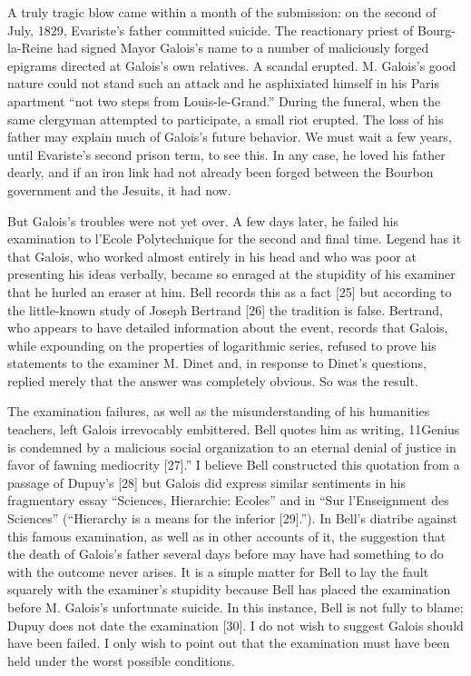 \documentclass[12pt]{article}
\begin{document}
A truly tragic blow came within a month of the submission: on the second of July, 1829, Evariste's father committed suicide. The reactionary priest of Bourg-la-Reine had signed Mayor Galois's name to a number of maliciously forged epigrams directed at Galois's own relatives. A scandal erupted. M. Galois's good nature could not stand such an attack and he asphixiated himself in his Paris apartment ``not two steps from Louis-le-Grand.'' During the funeral, when the same clergyman attempted to participate, a small riot erupted. The loss of his father may explain much of Galois's future behavior. We must wait a few years, until Evariste's second prison term, to see this. In any case, he loved his father dearly, and if an iron link had not already been forged between the Bourbon government and the Jesuits, it had now.

But Galois's troubles were not yet over. A few days later, he failed his examination to l'Ecole Polytechnique for the second and final time. Legend has it that Galois, who worked almost entirely in his head and who was poor at presenting his ideas verbally, became so enraged at the stupidity of his examiner that he hurled an eraser at him. Bell records this as a fact [25] but according to the little-known study of Joseph Bertrand [26] the tradition is false. Bertrand, who appears to have detailed information about the event, records that Galois, while expounding on the properties of logarithmic series, refused to prove his statements to the examiner M. Dinet and, in response to Dinet's questions, replied merely that the answer was completely obvious. So was the result.

The examination failures, as well as the misunderstanding of his humanities teachers, left Galois irrevocably embittered. Bell quotes him as writing, 11Genius is condemned by a malicious social organization to an eternal denial of justice in favor of fawning mediocrity [27].'' I believe Bell constructed this quotation from a passage of Dupuy's [28] but Galois did express similar sentiments in his fragmentary essay ``Sciences, Hierarchie: Ecoles'' and in ``Sur l'Enseignment des Sciences'' (``Hierarchy is a means for the inferior [29].''). In Bell's diatribe against this famous examination, as well as in other accounts of it, the suggestion that the death of Galois's father several days before may have had something to do with the outcome never arises. It is a simple matter for Bell to lay the fault squarely with the examiner's stupidity because Bell has placed the examination before M. Galois's unfortunate suicide. In this instance, Bell is not fully to blame; Dupuy does not date the examination [30]. I do not wish to suggest Galois should have been failed. I only wish to point out that the examination must have been held under the worst possible conditions.
\end{document}
